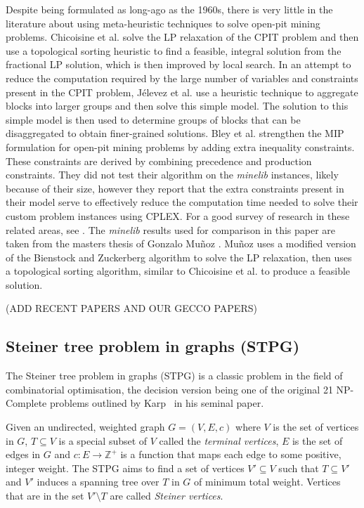 \documentclass[journal]{IEEEtran}
\begin{document}

Despite being formulated as long-ago as the 1960s, there is very little in the literature about using meta-heuristic techniques to solve open-pit mining problems. Chicoisine et al. \cite{cpit} solve the LP relaxation of the CPIT problem and then use a topological sorting heuristic to find a feasible, integral solution from the fractional LP solution, which is then improved by local search.
%
In an attempt to reduce the computation required by the large number of variables and constraints present in the CPIT problem, J\'elevez et al. \cite{aggregate} use a heuristic technique to aggregate blocks into larger groups and then solve this simple model. The solution to this simple model is then used to determine groups of blocks that can be disaggregated to obtain finer-grained solutions.
%
Bley et al. strengthen the MIP formulation for open-pit mining problems by adding extra inequality constraints. These constraints are derived by combining precedence and production constraints. They did not test their algorithm on the \emph{minelib} instances, likely because of their size, however they report that the extra constraints present in their model serve to effectively reduce the computation time needed to solve their custom problem instances using CPLEX. For a good survey of research in these related areas, see \cite{hochbaum,meagher}.
%
The \emph{minelib} results used for comparison in this paper are taken from the masters thesis of Gonzalo Mu\~noz \cite{toposort}. Mu\~noz uses a modified version of the Bienstock and Zuckerberg algorithm \cite{bz} to solve the LP relaxation, then uses a topological sorting algorithm, similar to Chicoisine et al. to produce a feasible solution.

{\color{red}(ADD RECENT PAPERS AND OUR GECCO PAPERS)}


\subsection{Steiner tree problem in graphs (STPG)}

The Steiner tree problem in graphs (STPG) is a classic problem in the field of combinatorial optimisation, the decision version being one of the original 21 NP-Complete problems outlined by Karp~\cite{np:karp} in his seminal paper.

Given an undirected, weighted graph $G = (V,E,c)$ where $V$ is the set of vertices in $G$, $T \subseteq V$ is a special subset of $V$ called the \emph{terminal vertices}, $E$ is the set of edges in $G$ and $c : E \to \mathbb{Z^+}$ is a function that maps each edge to some positive, integer weight. The STPG aims to find a set of vertices $V' \subseteq V$ such that $T \subseteq V'$ and $V'$ induces a spanning tree over $T$ in $G$ of minimum total weight. Vertices that are in the set $V' \setminus T$ are called \emph{Steiner vertices}.
\end{document}
